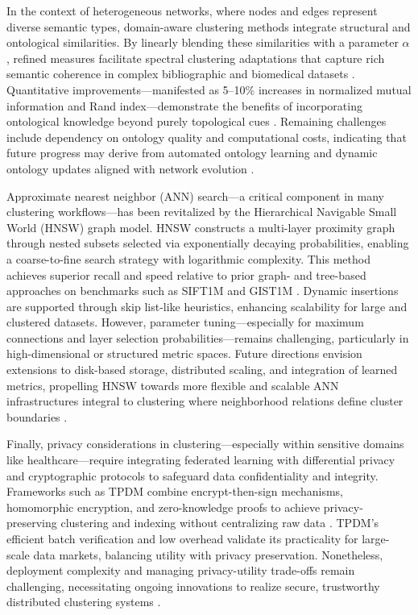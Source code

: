 \documentclass[11pt]{article}
\begin{document}
In the context of heterogeneous networks, where nodes and edges represent diverse semantic types, domain-aware clustering methods integrate structural and ontological similarities. By linearly blending these similarities with a parameter \(\alpha\), refined measures facilitate spectral clustering adaptations that capture rich semantic coherence in complex bibliographic and biomedical datasets \cite{ref14}. Quantitative improvements—manifested as 5–10\% increases in normalized mutual information and Rand index—demonstrate the benefits of incorporating ontological knowledge beyond purely topological cues \cite{ref14}. Remaining challenges include dependency on ontology quality and computational costs, indicating that future progress may derive from automated ontology learning and dynamic ontology updates aligned with network evolution \cite{ref14}.

Approximate nearest neighbor (ANN) search—a critical component in many clustering workflows—has been revitalized by the Hierarchical Navigable Small World (HNSW) graph model. HNSW constructs a multi-layer proximity graph through nested subsets selected via exponentially decaying probabilities, enabling a coarse-to-fine search strategy with logarithmic complexity. This method achieves superior recall and speed relative to prior graph- and tree-based approaches on benchmarks such as SIFT1M and GIST1M \cite{ref4}. Dynamic insertions are supported through skip list-like heuristics, enhancing scalability for large and clustered datasets. However, parameter tuning—especially for maximum connections and layer selection probabilities—remains challenging, particularly in high-dimensional or structured metric spaces. Future directions envision extensions to disk-based storage, distributed scaling, and integration of learned metrics, propelling HNSW towards more flexible and scalable ANN infrastructures integral to clustering where neighborhood relations define cluster boundaries \cite{ref4}.

Finally, privacy considerations in clustering—especially within sensitive domains like healthcare—require integrating federated learning with differential privacy and cryptographic protocols to safeguard data confidentiality and integrity. Frameworks such as TPDM combine encrypt-then-sign mechanisms, homomorphic encryption, and zero-knowledge proofs to achieve privacy-preserving clustering and indexing without centralizing raw data \cite{ref22,ref25}. TPDM’s efficient batch verification and low overhead validate its practicality for large-scale data markets, balancing utility with privacy preservation. Nonetheless, deployment complexity and managing privacy-utility trade-offs remain challenging, necessitating ongoing innovations to realize secure, trustworthy distributed clustering systems \cite{ref22,ref25}.
\end{document}

